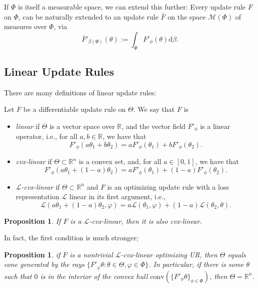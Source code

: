 \documentclass{uai2023}
\theoremstyle{plain}
\newtheorem{prop}[theorem]{Proposition}
\theoremstyle{definition}
\begin{document}
If $\Phi$ is itself a measurable space, we can extend this further:
Every  update rule $F$ on $\Phi$, can be naturally extended to an update rule $\bar F$ on the space $\mathcal M(\Phi)$ of measures over $\Phi$, via
\[
\bar F'_{\beta(\Phi)}( \theta ) := \int_{\Phi} F'_\phi(\theta) \mathrm d\beta.
\]





\subsection{Linear Update Rules}



There are many definitions of linear update rules:
\begin{defn}\label{ax:linear}
Let $F$ be a differentiable update rule on $\Theta$. We say that $F$ is \textellipsis
\begin{itemize}
\item \emph{linear} if $\Theta$ is a vector space over $\mathbb R$, and the
vector field $F'_\phi$ is a linear operator, i.e., for all $a, b \in \mathbb R$, we have that
\[ F'_\phi(a \theta_1 + b \theta_2) = a F'_\phi(\theta_1) + b F'_\phi(\theta_2). \]

\item \emph{cvx-linear} if $\Theta \subset \mathbb R^n$ is a convex set, and, for all $a \in [0,1]$, we have that
\[ F'_\phi(a \theta_1 + (1-a) \theta_2) = a F'_\phi(\theta_1) + (1-a) F'_\phi(\theta_2). \]

\item \emph{$\mathcal L$-cvx-linear} if $\Theta \subset \mathbb R^n$ and $F$ is an optimizing update rule with a loss representation $\mathcal L$ linear in its first argument, i.e.,
\[
    \mathcal L(a \theta_1 + (1-a) \theta_2, \varphi) = a \mathcal L(\theta_1, \varphi) + (1-a) \mathcal L(\theta_2, \theta).
\]
\end{itemize}
\end{defn}

\begin{prop}
If $F$ is a $\mathcal L$-cvx-linear, then it is also cvx-linear.
\end{prop}

In fact, the first condition is much stronger;
\begin{prop}
if $F$ is a nontrivial $\mathcal L$-cvx-linear optimizing UR, then $\Theta$ equals cone generated by  the rays $\{ F'_\varphi\theta : \theta \in \Theta, \varphi \in \Phi \}$. In particular, if there is some $\theta$ such that $0$ is in the interior of the convex hull $\mathrm{conv}(\{F'_\phi\theta\}_{\phi \in \Phi})$, then $\Theta = \mathbb R^n$.
\end{prop}
\end{document}
